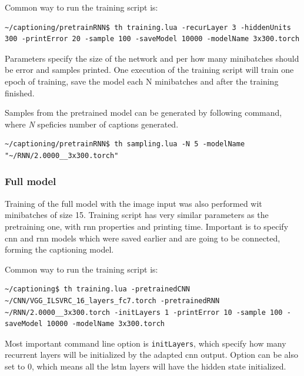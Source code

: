 Common way to run the training script is:

\hspace{1cm}
\begin{lstlisting}[firstnumber=1,breakindent=75pt,frame=single]
~/captioning/pretrainRNN$ th training.lua -recurLayer 3 -hiddenUnits 300 -printError 20 -sample 100 -saveModel 10000 -modelName 3x300.torch
\end{lstlisting}
\hspace{1cm}

Parameters specify the size of the network and per how many minibatches should be error and samples printed. One execution of the training script will train one epoch of training, save the model each N minibatches and after the training finished.

Samples from the pretrained model can be generated by following command, where \emph{N} speficies number of captions generated.

\hspace{1cm}
\begin{lstlisting}[firstnumber=1,breakindent=75pt,frame=single]
~/captioning/pretrainRNN$ th sampling.lua -N 5 -modelName "~/RNN/2.0000__3x300.torch"
\end{lstlisting}
\hspace{1cm}

\subsubsection{Full model}

Training of the full model with the image input was also performed wit minibatches of size 15. Training script has very similar parameters as the pretraining one, with \gls{rnn} properties and printing time. Important is to specify \gls{cnn} and \gls{rnn} models which were saved earlier and are going to be connected, forming the captioning model. 

Common way to run the training script is:

\hspace{1cm}
\begin{lstlisting}[firstnumber=1,breakindent=75pt,frame=single]
~/captioning$ th training.lua -pretrainedCNN ~/CNN/VGG_ILSVRC_16_layers_fc7.torch -pretrainedRNN ~/RNN/2.0000__3x300.torch -initLayers 1 -printError 10 -sample 100 -saveModel 10000 -modelName 3x300.torch
\end{lstlisting}
\hspace{1cm}

Most important command line option is \texttt{initLayers}, which specify how many recurrent layers will be initialized by the adapted \gls{cnn} output. Option can be also set to 0, which means all the \gls{lstm} layers will have the hidden state initialized.

